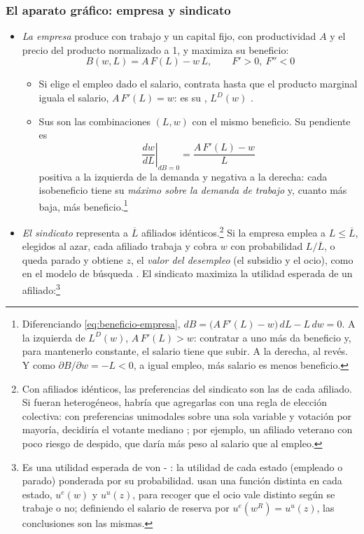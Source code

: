 \documentclass[11pt]{article}
\begin{document}
\subsubsection{El aparato gráfico: empresa y sindicato}\label{sec:aparato-grafico}

\begin{itemize}
\item \emph{La empresa} produce con trabajo y un capital fijo, con productividad $A$ y el precio del producto normalizado a 1, y maximiza su beneficio:
  \begin{equation}
  B(w,L)=A\,F(L)-w\,L,\qquad F'>0,\ F''<0 \label{eq:beneficio-empresa}
  \end{equation}
  \begin{itemize}
  \item Si elige el empleo dado el salario, contrata hasta que el producto marginal iguala el salario, $A\,F'(L)=w$: es su , $L^D(w)$ .
  \item Sus  son las combinaciones $(L,w)$ con el mismo beneficio. Su pendiente es
    \begin{equation}
    \left.\frac{dw}{dL}\right|_{dB=0}=\frac{A\,F'(L)-w}{L} \label{eq:pendiente-isobeneficio}
    \end{equation}
    positiva a la izquierda de la demanda y negativa a la derecha: cada isobeneficio tiene su \emph{máximo sobre la demanda de trabajo} y, cuanto más baja, más beneficio.\footnote{Diferenciando \eqref{eq:beneficio-empresa}, $dB=\big(A\,F'(L)-w\big)\,dL-L\,dw=0$. A la izquierda de $L^D(w)$, $A\,F'(L)>w$: contratar a uno más da beneficio y, para mantenerlo constante, el salario tiene que subir. A la derecha, al revés. Y como $\partial B/\partial w=-L<0$, a igual empleo, más salario es menos beneficio.}
  \end{itemize}
\item \emph{El sindicato} representa a $\overline{L}$ afiliados idénticos\nocite{Booth1995Economics}.\footnote{Con afiliados idénticos, las preferencias del sindicato son las de cada afiliado. Si fueran heterogéneos, habría que agregarlas con una regla de elección colectiva: con preferencias unimodales sobre una sola variable y votación por mayoría, decidiría el votante mediano ; por ejemplo, un afiliado veterano con poco riesgo de despido, que daría más peso al salario que al empleo.} Si la empresa emplea a $L\leq\overline{L}$, elegidos al azar, cada afiliado trabaja y cobra $w$ con probabilidad $L/\overline{L}$, o queda parado y obtiene $z$, el \emph{valor del desempleo} (el subsidio y el ocio), como en el modelo de búsqueda . El sindicato maximiza la utilidad esperada de un afiliado:\footnote{Es una utilidad esperada de von - : la utilidad de cada estado (empleado o parado) ponderada por su probabilidad. \textcite[cap.~7]{Cahuc2014Labor} usan una función distinta en cada estado, $u^e(w)$ y $u^u(z)$, para recoger que el ocio vale distinto según se trabaje o no; definiendo el salario de reserva por $u^e(w^R)=u^u(z)$, las conclusiones son las mismas.}

\end{itemize}
\end{document}
